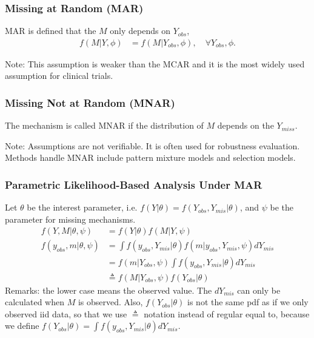 \documentclass[notes=no]{beamer}
\begin{document}
\begin{frame}
	\frametitle{Missing at Random (MAR)}
	\begin{definition}[MAR]
	MAR is defined that the $M$ only depends on $Y_{obs}$,
	\begin{align*}
	f(M | Y, \phi) &= f(M|Y_{obs}, \phi), \quad \forall Y_{obs}, \phi.
	\end{align*}
	\end{definition}
	Note: This assumption is weaker than the MCAR and it is the most widely used assumption for clinical trials.
\end{frame}

\begin{frame}
	\frametitle{Missing Not at Random (MNAR)}
	\begin{definition}[MNAR]
	The mechanism is called MNAR if the distribution of $M$ depends on the $Y_{miss}$.	
	\end{definition}
Note: Assumptions are not verifiable. It is often used for robustness evaluation. Methods handle MNAR include pattern mixture models and selection models.	
\end{frame}

\begin{frame}
	\frametitle{Parametric Likelihood-Based Analysis Under MAR}
		Let $\theta$ be the interest parameter, i.e. $f(Y|\theta) = f(Y_{obs}, Y_{mis}|\theta)$, and $\psi$ be the parameter for missing mechanisms. 
			\begin{align*}
		f(Y,M|\theta, \psi) &= f(Y|\theta) f(M|Y,\psi)\\
		f(y_{obs},m|\theta, \psi)&= \int f(y_{obs}, Y_{mis}|\theta) f(m|y_{obs}, Y_{mis},\psi) d Y_{mis} \\
		&= f(m|Y_{obs}, \psi) \int f(y_{obs},Y_{mis}|\theta) dY_{mis}\\
		&\triangleq f(M|Y_{obs}, \psi) f(Y_{obs}|\theta)
		\end{align*}
Remarks: the lower case means the observed value. The $dY_{mis}$ can only be calculated when $M$ is observed. Also, $f(Y_{obs}|\theta)$ is not the same pdf as if we only observed iid data, so that we use $\triangleq$ notation instead of regular equal to, because we define  $f(Y_{obs}|\theta) = \int f(y_{obs},Y_{mis}|\theta) dY_{mis}$.		
\end{frame}
\end{document}
